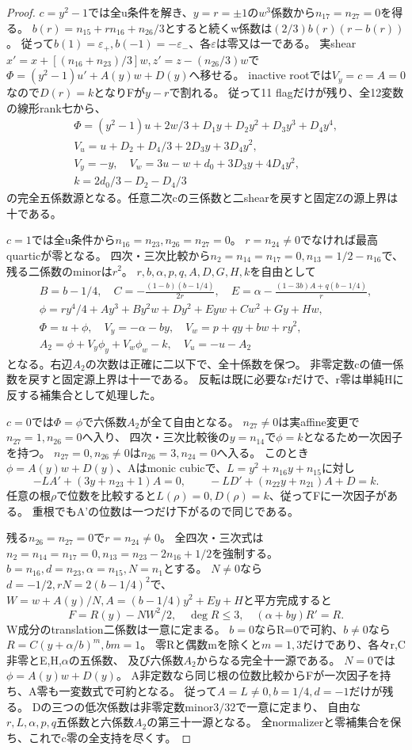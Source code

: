 \documentclass[a4paper,11pt]{ltjsarticle}
\theoremstyle{definition}
\begin{document}
\begin{proof}
$c=y^2-1$では全u条件を解き、$y=r=\pm1$の$w^3$係数から$n_{17}=n_{27}=0$を得る。
$b(r)=n_{15}+rn_{16}+n_{26}/3$とすると続くw係数は$(2/3)b(r)(r-b(r))$。
従って$b(1)=\varepsilon_+,b(-1)=-\varepsilon_-$、各$\varepsilon$は零又は一である。
実shear$x'=x+[(n_{16}+n_{23})/3]w,z'=z-(n_{26}/3)w$で
$\Phi=(y^2-1)u'+A(y)w+D(y)$へ移せる。
inactive rootでは$V_y=c=A=0$なので$D(r)=k$となりFが$y-r$で割れる。
従って11 flagだけが残り、全12変数の線形rank七から、
\[
\begin{gathered}
 \Phi=(y^2-1)u+2w/3+D_1y+D_2y^2+D_3y^3+D_4y^4,\\
 V_u=u+D_2+D_4/3+2D_3y+3D_4y^2,\\
 V_y=-y,\quad V_w=3u-w+d_0+3D_3y+4D_4y^2,\\
 k=2d_0/3-D_2-D_4/3
\end{gathered}
\]
の完全五係数源となる。任意二次cの三係数と二shearを戻すと固定Zの源上界は十である。

$c=1$では全u条件から$n_{16}=n_{23},n_{26}=n_{27}=0$。
$r=n_{24}\ne0$でなければ最高quarticが零となる。
四次・三次比較から$n_2=n_{14}=n_{17}=0,n_{13}=1/2-n_{16}$で、残る二係数のminorは$r^2$。
$r,b,\alpha,p,q,A,D,G,H,k$を自由として
\[
\begin{gathered}
 B=b-1/4,\quad C=-\frac{(1-b)(b-1/4)}{2r},\quad
 E=\alpha-\frac{(1-3b)A+q(b-1/4)}r,\\
 \phi=ry^4/4+Ay^3+By^2w+Dy^2+Eyw+Cw^2+Gy+Hw,\\
 \Phi=u+\phi,\quad V_y=-\alpha-by,\quad V_w=p+qy+bw+ry^2,\\
 A_2=\phi+V_y\phi_y+V_w\phi_w-k,\quad V_u=-u-A_2
\end{gathered}
\]
となる。右辺$A_2$の次数は正確に二以下で、全十係数を保つ。
非零定数cの値一係数を戻すと固定源上界は十一である。
反転は既に必要なrだけで、r零は単純Hに反する補集合として処理した。

$c=0$では$\Phi=\phi$で六係数$A_2$が全て自由となる。
$n_{27}\ne0$は実affine変更で$n_{27}=1,n_{26}=0$へ入り、
四次・三次比較後の$y=n_{14}$で$\phi=k$となるため一次因子を持つ。
$n_{27}=0,n_{26}\ne0$は$n_{26}=3,n_{24}=0$へ入る。
このとき$\phi=A(y)w+D(y)$、Aはmonic cubicで、$L=y^2+n_{16}y+n_{15}$に対し
\[
 -LA'+(3y+n_{23}+1)A=0,\qquad
 -LD'+(n_{22}y+n_{21})A+D=k.
\]
任意の根$\rho$で位数を比較すると$L(\rho)=0,D(\rho)=k$、従ってFに一次因子がある。
重根でもA'の位数は一つだけ下がるので同じである。

残る$n_{26}=n_{27}=0$で$r=n_{24}\ne0$。
全四次・三次式は$n_2=n_{14}=n_{17}=0,n_{13}=n_{23}-2n_{16}+1/2$を強制する。
$b=n_{16},d=n_{23},\alpha=n_{15},N=n_1$とする。
$N\ne0$なら$d=-1/2,rN=2(b-1/4)^2$で、
$W=w+A(y)/N,A=(b-1/4)y^2+Ey+H$と平方完成すると
\[
 F=R(y)-NW^2/2,\quad \deg R\le3,\quad(\alpha+by)R'=R.
\]
W成分のtranslation二係数は一意に定まる。
$b=0$ならR=0で可約、$b\ne0$なら$R=C(y+\alpha/b)^m,bm=1$。
零Rと偶数mを除くと$m=1,3$だけであり、各々r,C非零とE,H,$\alpha$の五係数、
及び六係数$A_2$からなる完全十一源である。
$N=0$では$\phi=A(y)w+D(y)$。
A非定数なら同じ根の位数比較からFが一次因子を持ち、A零も一変数式で可約となる。
従って$A=L\ne0,b=1/4,d=-1$だけが残る。
Dの三つの低次係数は非零定数minor$3/32$で一意に定まり、
自由な$r,L,\alpha,p,q$五係数と六係数$A_2$の第三十一源となる。
全normalizerと零補集合を保ち、これでc零の全支持を尽くす。


\end{proof}
\end{document}
